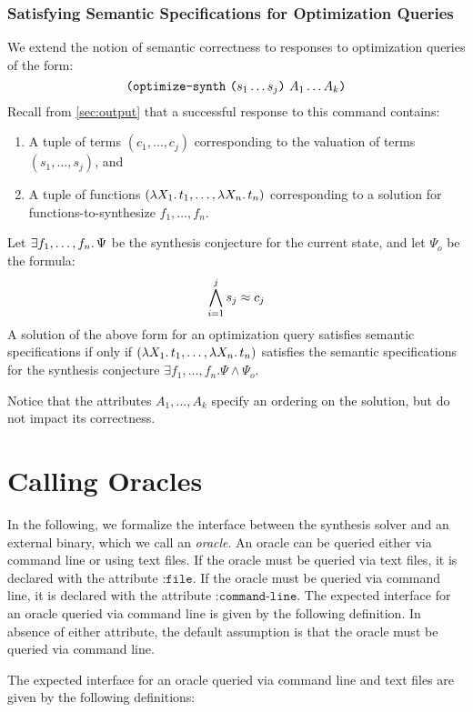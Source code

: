 \documentclass[english,a4paper,10pt]{article}
\begin{document}
\subsubsection{Satisfying Semantic Specifications for Optimization Queries}
We extend the notion of semantic correctness to responses to optimization
queries of the form:
\[
\texttt{(}\texttt{optimize-synth}\mbox{ }\texttt{(}s_1 \ldots s_j\texttt{)}\mbox{ } A_1 \ldots A_k\texttt{)}
\]
Recall from \cref{sec:output} that a successful response to this command
contains:
\begin{enumerate}
\item A tuple of terms $(c_1, \ldots, c_j)$ corresponding to the valuation of terms $(s_1, \ldots, s_j)$, and
\item A tuple of functions $( \lambda X_1 \ldotp t_1, \ldots, \lambda X_n \ldotp t_n)$
corresponding to a solution for functions-to-synthesize $f_1, \ldots, f_n$.
\end{enumerate}
Let $\exists f_1, \ldots, f_n \ldotp\Psi$ be the synthesis conjecture
for the current state, and let $\Psi_{o}$ be the formula:
\[
\bigwedge_{i=1}^{j} s_j \approx c_j
\]
A solution of the above form for an optimization query
satisfies semantic specifications if only if 
$( \lambda X_1 \ldotp t_1, \ldots, \lambda X_n \ldotp t_n)$
satisfies the semantic specifications
for the synthesis conjecture $\exists f_1, \ldots, f_n. \Psi \wedge \Psi_{o}$.

Notice that the attributes $A_1, \ldots, A_k$ specify an ordering on the
solution, but do not impact its correctness.

\section{Calling Oracles}%
\label{sec:oracleimplementations}

In the following, we formalize the interface between the
synthesis solver and an external binary, which we call an \emph{oracle}.
An oracle can be queried either via command line
or using text files. If the oracle must be queried via text files, it is declared with the attribute $\texttt{:file}$.
If the oracle must be queried via command line, it is declared with the attribute $\texttt{:command-line}$.
The expected interface for an oracle queried via command line is given by the following definition. In absence of either attribute, 
the default assumption is that the oracle must be queried via command line.

The expected interface for an oracle queried via command line and text files are given by the following definitions:
\end{document}
